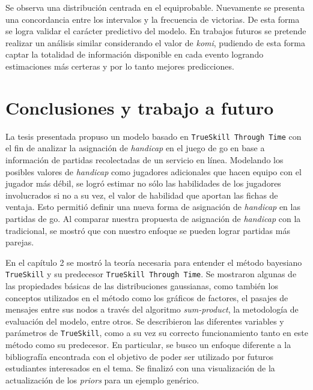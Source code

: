 \documentclass[11pt,twoside,spanish]{report} %
\begin{document}
Se observa una distribuci\'on centrada en el equiprobable.
Nuevamente se presenta una concordancia entre los intervalos y la frecuencia de victorias.
De esta forma se logra validar el car\'acter predictivo del modelo.
En trabajos futuros se pretende realizar un an\'alisis similar considerando el valor de \textit{komi}, pudiendo de esta forma captar la totalidad de informaci\'on disponible en cada evento logrando estimaciones m\'as certeras y por lo tanto mejores predicciones.


\chapter{Conclusiones y trabajo a futuro}


La tesis presentada propuso un modelo basado en \texttt{TrueSkill Through Time} con el fin de analizar la asignaci\'on de \textit{handicap} en el juego de go en base a informaci\'on de partidas recolectadas de un servicio en l\'inea.
Modelando los posibles valores  de \textit{handicap} como jugadores adicionales que hacen equipo con el jugador m\'as d\'ebil, se logr\'o estimar no s\'olo las habilidades de los jugadores involucrados si no a su vez, el valor de habilidad que aportan las fichas de ventaja. 
Esto permiti\'o definir una nueva forma de asignaci\'on de \textit{handicap} en las partidas de go.
Al comparar nuestra propuesta de asignaci\'on de \textit{handicap} con la tradicional, se mostr\'o que con nuestro enfoque se pueden lograr partidas m\'as parejas. 

En el cap\'itulo 2 se mostr\'o la teor\'ia necesaria para entender el m\'etodo bayesiano  \texttt{TrueSkill} y  su predecesor \texttt{TrueSkill Through Time}.
Se mostraron algunas de las propiedades b\'asicas de las distribuciones gaussianas, como tambi\'en los conceptos utilizados en el m\'etodo como los gr\'aficos de factores, el pasajes de mensajes entre sus nodos a trav\'es del algoritmo \textit{sum-product}, la metodolog\'ia de evaluaci\'on del modelo, entre otros.
Se describieron las diferentes variables y par\'ametros de \texttt{TrueSkill}, como a su vez su correcto funcionamiento tanto en este m\'etodo como su predecesor.
En particular, se busco un enfoque diferente a la bibliograf\'ia encontrada con el objetivo de poder ser utilizado por futuros estudiantes interesados en el tema.
Se finaliz\'o con una visualizaci\'on de la actualizaci\'on de los \textit{priors} para un ejemplo gen\'erico. 
\end{document}
